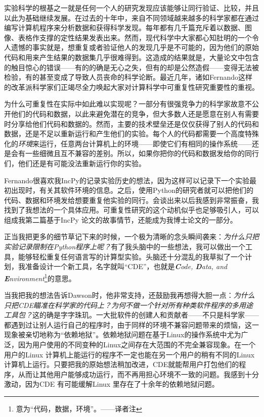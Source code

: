 \documentclass[letter,12pt]{book}
\begin{document}
\begin{CJK}{UTF8}{gbsn}
实验科学的根基之一就是任何一个人的研究发现应该能够让同行验证、比较，并且以此为基础继续发展。在过去的十年中，来自不同领域越来越多的科学家都在通过编写计算机程序来分析数据和获得科学发现。每年都有几千篇充斥着以数据、图像、表格作支撑的定性结果发表出来。然而，现代科学中大家都心知肚明的一个令人遗憾的事实就是，想重复或者验证他人的发现几乎是不可能的，因为他们的原始代码和用来产生结果的数据集几乎很难得到。这造成的结果就是，大量论文中包含的触目惊心的错误——有的的确是无心之失，但有的却是公然造假——变得无法被检验，有的甚至变成了导致人员丧命的科学论断。最近几年，诸如Fernando这样的改革派科学家们正竭尽全力唤起大家对计算科学中可重复性研究重要性的重视。

为什么可重复性在实际中如此难以实现呢？一部分有很强竞争力的科学家故意不公开他们的代码和数据，以此来避免潜在的竞争，但大多数人还是愿意在别人有需要时分享给他们代码和数据的。然而，主要的技术壁垒还是仅仅获得了别人的代码和数据，还是不足以重新运行和产生他们的实验。每个人的代码都需要一个高度特殊化的\emph{环境}来运行，任意两台计算机上的环境——即使它们有相同的操作系统——还是会有一些细微且互不兼容的差别。所以，如果你把你的代码和数据发给你的同行们，他们还是有可能没法重新运行你的实验。

Fernando很喜欢我IncPy的记录实验历史的想法，因为这样可以记录下一个实验最初出现时，有关其软件环境的信息。之后，使用Python的研究者就可以把他们的代码、数据和环境发给想要重复他实验的同行。会谈出来以后我感到非常振奋，我找到了我想法的一个具体应用。可重复性研究的这个动机似乎也足够吸引人，可以组成我第二篇基于IncPy 论文的故事情节，还能成为我博士论文的一部分。

正当我把更多的细节草记下来的时候，一个极为清晰的念头瞬间袭来：\emph{为什么只把实验记录限制在Python程序上呢？}有了我头脑中的一些想法，我可以做出一个工具，能够轻松重复任何语言写的计算型实验。头脑还十分混乱的我草拟了一个计划，我准备设计一个新工具，名字就叫“CDE”，也就是\emph{\textbf{C}ode, \textbf{D}ata, and \textbf{E}nvironment}\footnote{意为“代码，数据，环境”。——译者注}的意思。

\breakline

当我把我的想法告诉Dawson时，他非常支持，还鼓励我再想得大胆一点：\emph{为什么只把CDE瞄准在科学家的代码上？为何不做一个针对所有种类软件程序的多用途工具包？}这的确是字字珠玑。一大批软件的创建人和贡献者——不只是科学家——都遇到过让别人运行自己的程序时，由于同样的环境不兼容问题带来的烦恼，这一现象被亲切地称为“依赖地狱”。依赖地狱问题在基于Linux的操作系统中尤为广泛，因为用户使用的不同变种的Linux之间存在大范围的不完全兼容现象。在一个用户的Linux 计算机上能运行的程序不一定也能在另一个用户的稍有不同的Linux计算机上运行。只要把我的原始想法稍加改进，CDE就能帮用户打包他们的程序，从而让其他用户能够成功运行，而不再用担心环境不一致的问题。我感到十分激动，因为CDE 有可能缓解Linux 里存在了十余年的依赖地狱问题。


\end{CJK}
\end{document}
